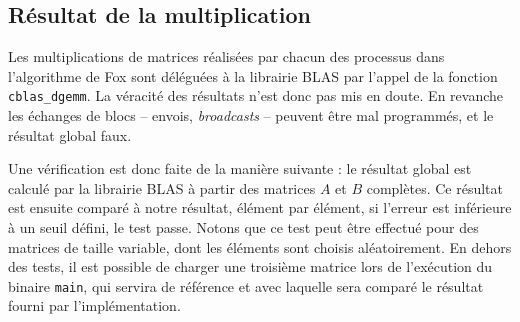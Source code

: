 \subsection{Résultat de la multiplication}

Les multiplications de matrices réalisées par chacun des processus dans l'algorithme de Fox sont déléguées à la librairie BLAS par l'appel de la fonction \texttt{cblas\_dgemm}. La véracité des résultats n'est donc pas mis en doute. En revanche les échanges de blocs -- envois, \emph{broadcasts} -- peuvent être mal programmés, et le résultat global faux. 

Une vérification est donc faite de la manière suivante : le résultat global est calculé par la librairie BLAS à partir des matrices $A$ et $B$ complètes. Ce résultat est ensuite comparé à notre résultat, élément par élément, si l'erreur est inférieure à un seuil défini, le test passe. Notons que ce test peut être effectué pour des matrices de taille variable, dont les éléments sont choisis aléatoirement. En dehors des tests, il est possible de charger une troisième matrice lors de l'exécution du binaire \texttt{main}, qui servira de référence et avec laquelle sera comparé le résultat fourni par l'implémentation.



